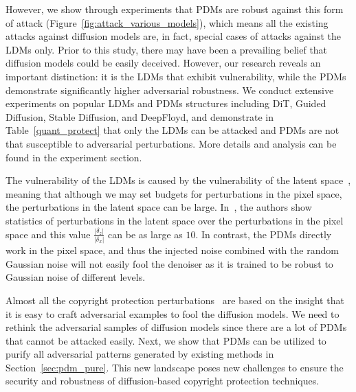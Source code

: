 \documentclass{article}
\begin{document}
However, we show through experiments that PDMs are robust against this form of attack (Figure~\ref{fig:attack_various_models}), which means all the existing attacks against diffusion models are, in fact, special cases of attacks against the LDMs only.
Prior to this study, there may have been a prevailing belief that diffusion models could be easily deceived. However, our research reveals an important distinction: it is the LDMs that exhibit vulnerability, while the PDMs demonstrate significantly higher adversarial robustness.
We conduct extensive experiments on popular LDMs and PDMs structures including DiT, Guided Diffusion, Stable Diffusion, and DeepFloyd, and demonstrate in Table~\ref{quant_protect} that only the LDMs can be attacked and PDMs are not that susceptible to adversarial perturbations. More details and analysis can be found in the experiment section.



The vulnerability of the LDMs is caused by the vulnerability of the latent space~\cite{sdsattack}, meaning that although we may set budgets for perturbations in the pixel space, the perturbations in the latent space can be large. In~\cite{sdsattack}, the authors show statistics of perturbations in the latent space over the perturbations in the pixel space and this value $\frac{|\delta_z|}{|\delta_x|}$ can be as large as $10$. In contrast, the PDMs directly work in the pixel space, and thus the injected noise combined with the random Gaussian noise will not easily fool the denoiser as it is trained to be robust to Gaussian noise of different levels. 








Almost all the copyright protection perturbations~\cite{glaze, liang2023mist, mist-v2} are based on the insight that it is easy to craft adversarial examples to fool the diffusion models.  We need to rethink the adversarial samples of diffusion models since there are a lot of PDMs that cannot be attacked easily. Next, we show that PDMs can be utilized to purify all adversarial patterns generated by existing methods in Section~\ref{sec:pdm_pure}.  This new landscape poses new challenges to ensure the security and robustness of diffusion-based copyright protection techniques.
\end{document}
